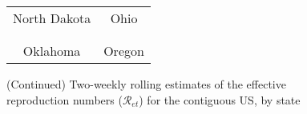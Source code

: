 \documentclass[12pt]{article}
\begin{document}
\begin{figure}[!p]%
\caption
{(Continued) Two-weekly rolling estimates of the effective reproduction numbers ($\mathcal
{R}_{et}$) for the contiguous US, by state}%
\vspace{-0.3cm}%


\begin{center}%
\hspace*{-0.2cm}%
\begin{tabular}
[c]{cc}%
{\footnotesize North Dakota} & {\footnotesize Ohio}\\%
{\includegraphics[
height=1.7763in,
width=3.5293in
]%
{figs/US-Re-ND-2W.png}%
}
&
{\includegraphics[
height=1.7763in,
width=3.5293in
]%
{figs/US-Re-OH-2W.png}%
}
\\
& \\
{\footnotesize Oklahoma} & {\footnotesize Oregon}\\%

\end{tabular}
\end{center}
\end{figure}
\end{document}
